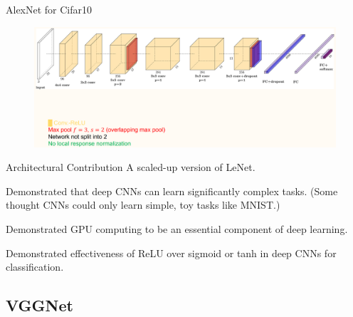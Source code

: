 \begin{frame}[allowframebreaks]

\begin{mydefinitionblock}{7.6}{AlexNet for Cifar10}
    \begin{figure}[H]
        \centering
        \includegraphics[width=1.0\textwidth]{.././assets/7.6.png}
    \end{figure}
\end{mydefinitionblock}

\end{frame}

\begin{frame}[allowframebreaks]

\begin{myconceptblock}{7.7}{Architectural Contribution}
    A scaled-up version of LeNet.

    Demonstrated that deep CNNs can learn significantly complex tasks. (Some thought CNNs could only learn simple, toy tasks like MNIST.)

    Demonstrated GPU computing to be an essential component of deep learning.

    Demonstrated effectiveness of ReLU over sigmoid or tanh in deep CNNs for classification.
\end{myconceptblock}

\end{frame}

\subsection{VGGNet}

